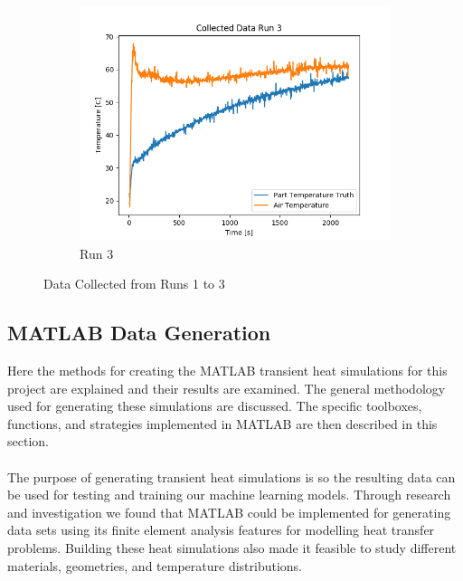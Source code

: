 \begin{figure}[ht]
\begin{subfigure}{.33\linewidth}
    	\includegraphics[width=\linewidth]{other/Raw_Data/3.png}
    	\caption{Run 3}
    \end{subfigure}\par\medskip
    \caption{Data Collected from Runs 1 to 3}
    \label{fig:real_data0-3}
\end{figure}

\subsection{MATLAB Data Generation}
Here the methods for creating the MATLAB transient heat simulations for this project are explained and their results are examined. The general methodology used for generating these simulations are discussed. The specific toolboxes, functions, and strategies implemented in MATLAB are then described in this section. \\\\
The purpose of generating transient heat simulations is so the resulting data can be used for testing and training our machine learning models. Through research and investigation we found that MATLAB could be implemented for generating data sets using its finite element analysis features for modelling heat transfer problems. Building these heat simulations also made it feasible to study different materials, geometries, and temperature distributions. 

